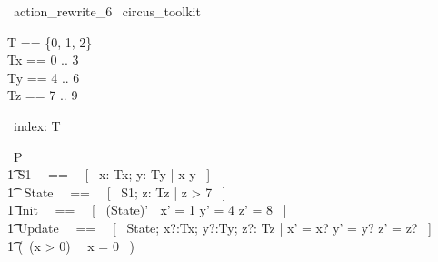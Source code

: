 % 
\begin{zsection}
  \SECTION\ action\_rewrite\_6 \parents\ circus\_toolkit
\end{zsection}

\begin{zed}
    T == \{0, 1, 2\} \\
	Tx == 0 .. 3 \\ 
	Ty == 4 .. 6 \\ 
	Tz == 7 .. 9 \\ 
\end{zed}

\begin{circus}
	\circchannel\ index: T \\
\end{circus}

\begin{circus}
    \circprocess\ P \circdef \circbegin \\
        \t1 S1 ~~==~~ [~  x: Tx; y: Ty | x  \land y  ~] \\
        \t1 \circstate\ State ~~==~~ [~ S1; z: Tz | z > 7 ~] \\
        \t1 Init ~~==~~ [~ (State)' | x' = 1 \land y' = 4 \land z' = 8 ~] \\
        \t1 Update ~~==~~ [~ \Delta State; x?:Tx; y?:Ty; z?: Tz | x' = x? \land y' = y? \land z' = z? ~] \\
        \t1 \circspot (\circif\ (x > 0) \circthen \Skip\ \circelse\ x = 0 \circthen \Skip\ \circfi) \\
	\circend
\end{circus}

